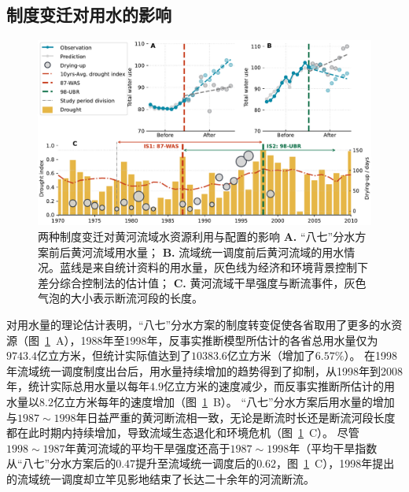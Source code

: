 \subsection{制度变迁对用水的影响}\label{result-2}

\begin{figure}[!htb]
	\centering
	\includegraphics[width=\linewidth]{img/ch5/main_results2.pdf}
	\caption[两种制度变迁对黄河流域水资源利用与配置的影响]{
        两种制度变迁对黄河流域水资源利用与配置的影响
        \textbf{A.} “八七”分水方案前后黄河流域用水量；
        \textbf{B.} 流域统一调度前后黄河流域的用水情况。蓝线是来自统计资料的用水量，灰色线为经济和环境背景控制下差分综合控制法的估计值；
        \textbf{C.} 黄河流域干旱强度与断流事件，灰色气泡的大小表示断流河段的长度。
	}\label{fig:main_results}
\end{figure}

对用水量的理论估计表明，“八七”分水方案的制度转变促使各省取用了更多的水资源（图~\ref{fig:main_results}~A），1988年至1998年，反事实推断模型所估计的各省总用水量仅为$9743.4$亿立方米，但统计实际值达到了$10383.6$亿立方米（增加了$6.57\%$）。
在1998年流域统一调度制度出台后，用水量持续增加的趋势得到了抑制，从1998年到2008年，统计实际总用水量以每年$4.9$亿立方米的速度减少，而反事实推断所估计的用水量以$8.2$亿立方米每年的速度增加（图~\ref{fig:main_results}~B）。
“八七”分水方案后用水量的增加与$1987 \sim 1998$年日益严重的黄河断流相一致，无论是断流时长还是断流河段长度都在此时期内持续增加，导致流域生态退化和环境危机（图~\ref{fig:main_results}~C）。
尽管$1998 \sim 1987$年黄河流域的平均干旱强度还高于$1987 \sim 1998$年（平均干旱指数从“八七”分水方案后的$0.47$提升至流域统一调度后的$0.62$，图~\ref{fig:main_results}~C），1998年提出的流域统一调度却立竿见影地结束了长达二十余年的河流断流。

